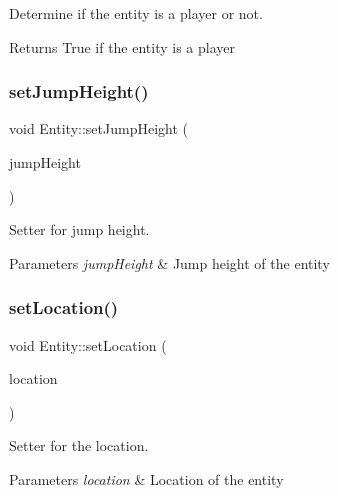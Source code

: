 Determine if the entity is a player or not. 

\begin{DoxyReturn}{Returns}
True if the entity is a player 
\end{DoxyReturn}
\mbox{\label{classEntity_ab6ccff5da8e3cdc67659b0e89158c199}} 
\subsubsection{\texorpdfstring{set\+Jump\+Height()}{setJumpHeight()}}
{\footnotesize\ttfamily void Entity\+::set\+Jump\+Height (\begin{DoxyParamCaption}\item[{double}]{jump\+Height }\end{DoxyParamCaption})}



Setter for jump height. 


\begin{DoxyParams}{Parameters}
{\em jump\+Height} & Jump height of the entity \\
\hline
\end{DoxyParams}
\mbox{\label{classEntity_a70bfcbab042dfd1f1571e06d406985f4}} 
\subsubsection{\texorpdfstring{set\+Location()}{setLocation()}}
{\footnotesize\ttfamily void Entity\+::set\+Location (\begin{DoxyParamCaption}\item[{const game\+Location \&}]{location }\end{DoxyParamCaption})}



Setter for the location. 


\begin{DoxyParams}{Parameters}
{\em location} & Location of the entity \\
\hline
\end{DoxyParams}
\mbox{\label{classEntity_a1ee8abc607182bd4dc3a650cafb98188}} 
